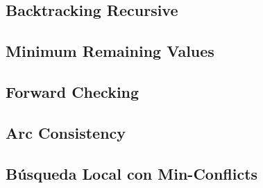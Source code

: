 \subsection{Backtracking Recursive}

\subsection{Minimum Remaining Values}

\subsection{Forward Checking}

\subsection{Arc Consistency}

\subsection{B\'usqueda Local con Min-Conflicts}